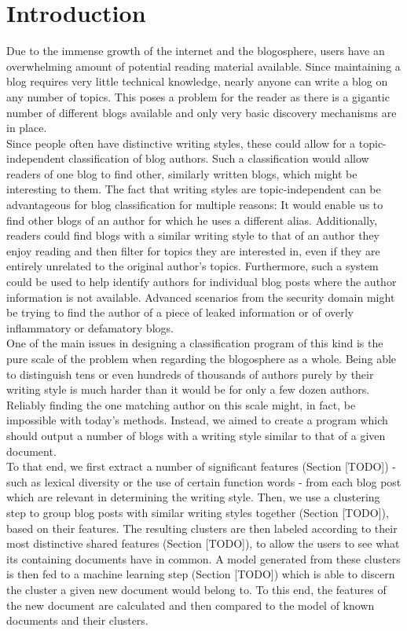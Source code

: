 
\section{Introduction}
\label{sec:introduction}

Due to the immense growth of the internet and the blogosphere, users have an overwhelming amount of potential reading material available. Since maintaining a blog requires very little technical knowledge, nearly anyone can write a blog on any number of topics. This poses a problem for the reader as there is a gigantic number of different blogs available and only very basic discovery mechanisms are in place.
\\
Since people often have distinctive writing styles, these could allow for a topic-independent classification of blog authors. Such a classification would allow readers of one blog to find other, similarly written blogs, which might be interesting to them. The fact that writing styles are topic-independent can be advantageous for blog classification for multiple reasons: It would enable us to find other blogs of an author for which he uses a different alias. Additionally, readers could find blogs with a similar writing style to that of an author they enjoy reading and then filter for topics they are interested in, even if they are entirely unrelated to the original author’s topics. Furthermore, such a system could be used to help identify authors for individual blog posts where the author information is not available. Advanced scenarios from the security domain might be trying to find the author of a piece of leaked information or of overly inflammatory or defamatory blogs.
\\
One of the main issues in designing a classification program of this kind is the pure scale of the problem when regarding the blogosphere as a whole. Being able to distinguish tens or even hundreds of thousands of authors purely by their writing style is much harder than it would be for only a few dozen authors. Reliably finding the one matching author on this scale might, in fact, be impossible with today’s methods. Instead, we aimed to create a program which should output a number of blogs with a writing style similar to that of a given document.
\\
To that end, we first extract a number of significant features (Section [TODO]) - such as lexical diversity or the use of certain function words - from each blog post which are relevant in determining the writing style. Then, we use a clustering step to group blog posts with similar writing styles together (Section [TODO]), based on their features. The resulting clusters are then labeled according to their most distinctive shared features (Section [TODO]), to allow the users to see what its containing documents have in common. A model generated from these clusters is then fed to a machine learning step (Section [TODO]) which is able to discern the cluster a given new document would belong to. To this end, the features of the new document are calculated and then compared to the model of known documents and their clusters.
